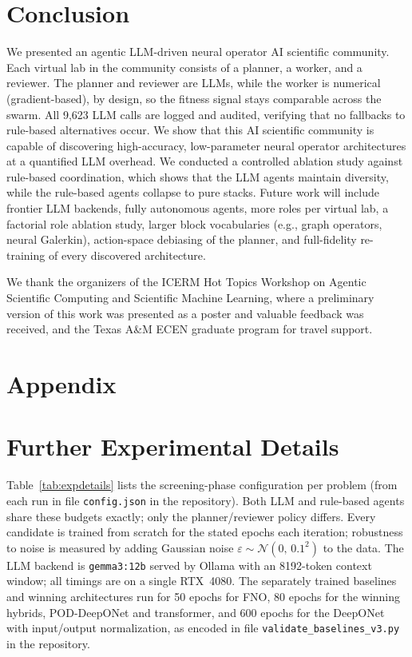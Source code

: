 \documentclass{article}
\begin{document}
\section{Conclusion}
We presented an agentic LLM-driven neural operator AI scientific community. Each virtual lab in the community consists of a planner, a worker, and a reviewer. The planner and reviewer are LLMs, while the worker is numerical (gradient-based), by design, so the fitness signal stays comparable across the swarm. All 9{,}623 LLM calls are logged and audited, verifying that no fallbacks to rule-based alternatives occur. We show that this AI scientific community is capable of discovering high-accuracy, low-parameter neural operator architectures at a quantified LLM overhead. We conducted a controlled ablation study against rule-based coordination, which shows that the LLM agents maintain diversity, while the rule-based agents collapse to pure stacks. Future work will include frontier LLM backends, fully autonomous agents, more roles per virtual lab, a factorial role ablation study, larger block vocabularies (e.g., graph operators, neural Galerkin), action-space debiasing of the planner, and full-fidelity re-training of every discovered architecture.

\begin{ack}
We thank the organizers of the ICERM Hot Topics Workshop on Agentic Scientific Computing and Scientific Machine Learning, where a preliminary version of this work was presented as a poster and valuable feedback was received, and the Texas A\&M ECEN graduate program for travel support.
\end{ack}




\appendix

\section*{Appendix}

\section{Further Experimental Details}\label{app:details}
Table~\ref{tab:expdetails} lists the screening-phase configuration per problem (from each run in file \texttt{config.json} in the repository). Both LLM and rule-based agents share these budgets exactly; only the planner/reviewer policy differs. Every candidate is trained from scratch for the stated epochs each iteration; robustness to noise is measured by adding Gaussian noise $\varepsilon\sim\mathcal{N}(0,\,0.1^2)$ to the data. The LLM backend is \texttt{gemma3:12b} served by Ollama with an 8192-token context window; all timings are on a single RTX~4080. The separately trained baselines and winning architectures run for 50 epochs for FNO, 80 epochs for the winning hybrids, POD-DeepONet and transformer, and 600 epochs for the DeepONet with input/output normalization, as encoded in file  \texttt{validate\_baselines\_v3.py} in the repository.
\end{document}
